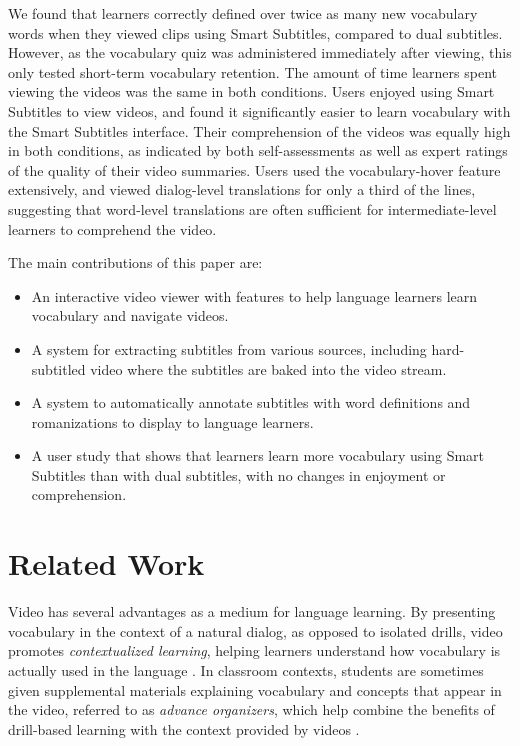\documentclass{sigchi}
\begin{document}
We found that learners correctly defined over twice as many new vocabulary
words when they viewed clips using Smart Subtitles, compared to dual subtitles.
However, as the vocabulary quiz was administered immediately after
viewing, this only tested short-term vocabulary retention.
The amount of time learners spent viewing the videos was the same in both conditions.
Users enjoyed
using Smart Subtitles to view videos, and found it
significantly easier to learn vocabulary with the Smart Subtitles interface.
Their comprehension of the videos was equally high in both conditions,
as indicated by both self-assessments as well as expert ratings
of the quality of their video summaries.
Users used the vocabulary-hover feature extensively,
and viewed dialog-level translations for only a third of the lines,
suggesting that word-level translations
are often sufficient for intermediate-level learners to comprehend the video.

The main contributions of this paper are:

\begin{itemize}[noitemsep]
\item An interactive video viewer with features to help language learners
learn vocabulary and navigate videos.
\item A system for extracting subtitles from various sources, including
hard-subtitled video where the subtitles are baked into the video stream.
\item A system to automatically annotate subtitles with word definitions
and romanizations to display to language learners.
\item A user study that shows that learners learn more vocabulary using Smart Subtitles than with dual subtitles, with no changes in enjoyment or comprehension.
\end{itemize}




\section{Related Work}

Video has several advantages as a medium for language learning.
By presenting vocabulary in the context of a natural dialog, as opposed to isolated drills,
video promotes \emph{contextualized learning}, helping learners understand how
vocabulary is actually used in the language \cite{videocontext}.
In classroom contexts, students are sometimes given supplemental materials
explaining vocabulary and concepts that appear in the video,
referred to as \emph{advance organizers}, which help combine the benefits of
drill-based learning with the context provided by videos \cite{advanceorganizer}.
\end{document}
